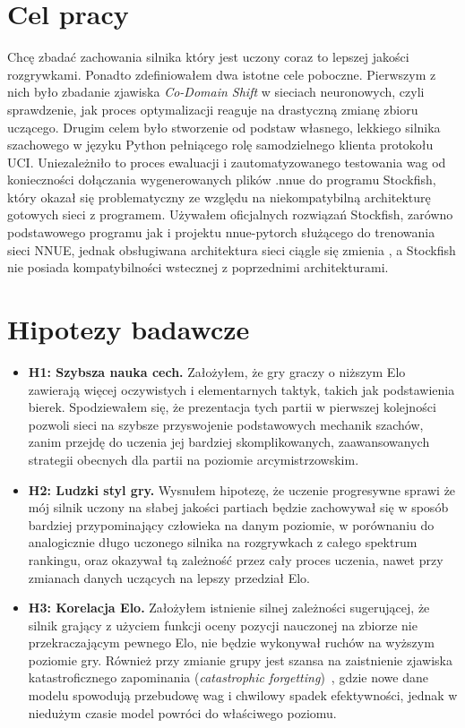 \documentclass[12pt,a4paper]{report}
\begin{document}
\section{Cel pracy}

Chcę zbadać zachowania silnika który jest uczony coraz to lepszej jakości rozgrywkami. Ponadto zdefiniowałem dwa istotne cele poboczne. Pierwszym z nich było zbadanie zjawiska \textit{Co-Domain Shift} w sieciach neuronowych, czyli sprawdzenie, jak proces optymalizacji reaguje na drastyczną zmianę zbioru uczącego. Drugim celem było stworzenie od podstaw własnego, lekkiego silnika szachowego w języku Python pełniącego rolę samodzielnego klienta protokołu UCI. Uniezależniło to proces ewaluacji i zautomatyzowanego testowania wag od konieczności dołączania wygenerowanych plików .nnue do programu Stockfish, który okazał się problematyczny ze względu na niekompatybilną architekturę gotowych sieci z programem. Używałem oficjalnych rozwiązań Stockfish, zarówno podstawowego programu jak i projektu nnue-pytorch służącego do trenowania sieci NNUE, jednak obsługiwana architektura sieci ciągle się zmienia \cite{nnue.md}, a Stockfish nie posiada kompatybilności wstecznej z poprzednimi architekturami.

\section{Hipotezy badawcze}

\begin{itemize}
    \item \textbf{H1: Szybsza nauka cech.} Założyłem, że gry graczy o niższym Elo zawierają więcej oczywistych i elementarnych taktyk, takich jak podstawienia bierek. Spodziewałem się, że prezentacja tych partii w pierwszej kolejności pozwoli sieci na szybsze przyswojenie podstawowych mechanik szachów, zanim przejdę do uczenia jej bardziej skomplikowanych, zaawansowanych strategii obecnych dla partii na poziomie arcymistrzowskim.
    \item \textbf{H2: Ludzki styl gry.} Wysnułem hipotezę, że uczenie progresywne sprawi że mój silnik uczony na słabej jakości partiach będzie zachowywał się w sposób bardziej przypominający człowieka na danym poziomie, w porównaniu do analogicznie długo uczonego silnika na rozgrywkach z całego spektrum rankingu, oraz okazywał tą zależność przez cały proces uczenia, nawet przy zmianach danych uczących na lepszy przedział Elo.
    \item \textbf{H3: Korelacja Elo.} Założyłem istnienie silnej zależności sugerującej, że silnik grający z użyciem funkcji oceny pozycji nauczonej na zbiorze nie przekraczającym pewnego Elo, nie będzie wykonywał ruchów na wyższym poziomie gry. Również przy zmianie grupy jest szansa na zaistnienie zjawiska katastroficznego zapominania (\textit{catastrophic forgetting})~\cite{mccloskey1989catastrophic}, gdzie nowe dane modelu spowodują przebudowę wag i chwilowy spadek efektywności, jednak w niedużym czasie model powróci do właściwego poziomu.
\end{itemize}
\end{document}
